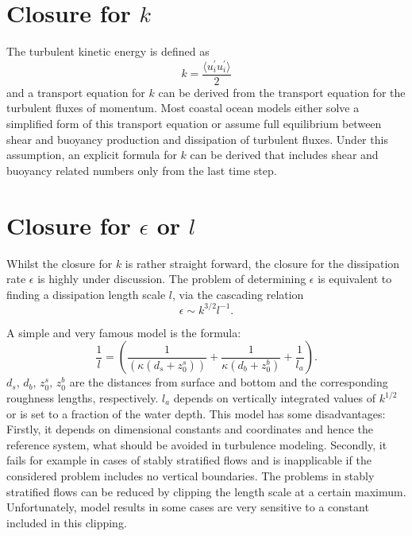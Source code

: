 \section{Closure for $k$ }

The turbulent kinetic energy is defined as
\begin{equation}
 \label{TKE}
 k = \frac{\langle u_i^\prime u_i^\prime \rangle}{2}
\end{equation}
and a transport equation for $k$ can be derived from the transport equation for the turbulent fluxes of momentum. Most coastal ocean models either solve a simplified form of this transport equation or assume full equilibrium between shear and buoyancy production and dissipation of turbulent fluxes. Under this assumption, an explicit formula for $k$ can be derived that includes shear and buoyancy related numbers only from the last time step. 

\section{Closure for $\epsilon$ or $l$ }

Whilst the closure for $k$ is rather straight forward, the closure for the dissipation rate $\epsilon$ is highly under discussion. The problem of determining $\epsilon$ is equivalent to finding a dissipation length scale $l$, via the cascading relation \citep[][]{UmlaufBurchard2005a}
\begin{equation}
 \label{cascad}
 \epsilon \sim k^{3 \slash 2} l^{-1}.
\end{equation}

A simple and very famous model is the \cite{blackadar1962} formula:
\begin{equation}
 \label{blackadar}
 \frac{1}{l} = \left( \frac{1}{(\kappa (d_s + z_0^s) )} + \frac{1}{\kappa (d_b + z_0^b)} + \frac{1}{l_a} \right).
\end{equation}
$d_s,\, d_b,\, z_0^s,\, z_0^b$ are the distances from surface and bottom and the corresponding roughness lengths, respectively. $l_a$ depends on vertically integrated values of $k^{1 \slash 2}$ or is set to a fraction of the water depth. This model has some disadvantages: Firstly, it depends on dimensional constants and coordinates and hence the reference system, what should be avoided in turbulence modeling. Secondly, it fails for example in cases of stably stratified flows and is inapplicable if the considered problem includes no vertical boundaries. The problems in stably stratified flows can be reduced by clipping the length scale at a certain maximum. Unfortunately, model results in some cases are very sensitive to a constant included in this clipping.

